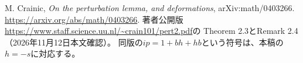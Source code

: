 M. Crainic,
\emph{On the perturbation lemma, and deformations},
arXiv:math/0403266.
\url{https://arxiv.org/abs/math/0403266}.
著者公開版\url{https://www.staff.science.uu.nl/~crain101/pert2.pdf}の
Theorem 2.3とRemark 2.4（2026年11月12日本文確認）。
同版の$ip=1+bh+hb$という符号は、本稿の$h=-s$に対応する。
